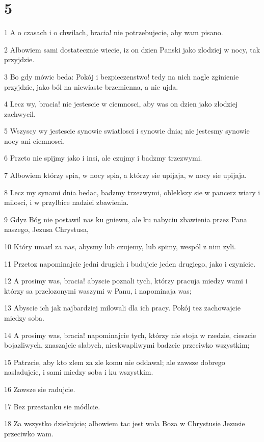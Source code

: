 \chapter{5}

\par 1 A o czasach i o chwilach, bracia! nie potrzebujecie, aby wam pisano.
\par 2 Albowiem sami dostatecznie wiecie, iz on dzien Panski jako zlodziej w nocy, tak przyjdzie.
\par 3 Bo gdy mówic beda: Pokój i bezpieczenstwo! tedy na nich nagle zginienie przyjdzie, jako ból na niewiaste brzemienna, a nie ujda.
\par 4 Lecz wy, bracia! nie jestescie w ciemnosci, aby was on dzien jako zlodziej zachwycil.
\par 5 Wszyscy wy jestescie synowie swiatlosci i synowie dnia; nie jestesmy synowie nocy ani ciemnosci.
\par 6 Przeto nie spijmy jako i insi, ale czujmy i badzmy trzezwymi.
\par 7 Albowiem którzy spia, w nocy spia, a którzy sie upijaja, w nocy sie upijaja.
\par 8 Lecz my synami dnia bedac, badzmy trzezwymi, obleklszy sie w pancerz wiary i milosci, i w przylbice nadziei zbawienia.
\par 9 Gdyz Bóg nie postawil nas ku gniewu, ale ku nabyciu zbawienia przez Pana naszego, Jezusa Chrystusa,
\par 10 Który umarl za nas, abysmy lub czujemy, lub spimy, wespól z nim zyli.
\par 11 Przetoz napominajcie jedni drugich i budujcie jeden drugiego, jako i czynicie.
\par 12 A prosimy was, bracia! abyscie poznali tych, którzy pracuja miedzy wami i którzy sa przelozonymi waszymi w Panu, i napominaja was;
\par 13 Abyscie ich jak najbardziej milowali dla ich pracy. Pokój tez zachowajcie miedzy soba.
\par 14 A prosimy was, bracia! napominajcie tych, którzy nie stoja w rzedzie, cieszcie bojazliwych, znaszajcie slabych, nieskwapliwymi badzcie przeciwko wszystkim;
\par 15 Patrzcie, aby kto zlem za zle komu nie oddawal; ale zawsze dobrego nasladujcie, i sami miedzy soba i ku wszystkim.
\par 16 Zawsze sie radujcie.
\par 17 Bez przestanku sie módlcie.
\par 18 Za wszystko dziekujcie; albowiem tac jest wola Boza w Chrystusie Jezusie przeciwko wam.
